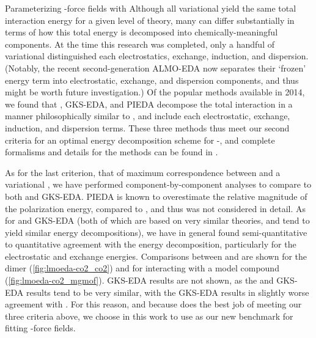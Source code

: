 \begin{section}{Parameterizing \cus-\mof force fields with \lmoeda}
Although all variational \edas yield the same
total interaction energy for a given level of theory, many \edas can differ substantially in terms of how
this total energy is decomposed into chemically-meaningful components. At the
time this research was completed, only a handful of variational \edas distinguished each
electrostatics, exchange, induction, and dispersion. (Notably, the recent
second-generation ALMO-EDA\cite{Horn2016b} now
separates their `frozen' energy term into electrostatic, exchange, and
dispersion components, and thus might be worth future investigation.) Of the
popular \eda methods available in 2014, we found that
\lmoeda,\cite{Su2009,Chen2010}
GKS-EDA,\cite{Su2014} and PIEDA\cite{Fedorov2006} decompose the total
interaction in a manner philosophically similar to \sapt, and include each
electrostatic, exchange, induction, and dispersion terms. These three methods
thus meet our second criteria for
an optimal energy decomposition scheme for \cus-\mofs, and complete formalisms and
details for the methods can be found in .

As for the last criterion, that of maximum correspondence between \sapt and a
variational \eda, we have performed component-by-component analyses
to compare \sapt to both \lmoeda and GKS-EDA. PIEDA is known to
overestimate the relative magnitude of the polarization energy, compared to
\sapt, and thus was not considered in detail.\cite{Pastorczak2017} As for
\lmoeda and GKS-EDA (both of which are based on very similar theories, and
tend to yield similar energy decompositions), we have in
general found semi-quantitative to quantitative agreement with the \sapt
energy decomposition, particularly for the electrostatic and exchange
energies. Comparisons between \lmoeda and \sapt are shown for the \co dimer
(\cref{fig:lmoeda-co2_co2}) and for \co interacting with a model \mgmof
compound (\cref{fig:lmoeda-co2_mgmof}). GKS-EDA results are not shown, as
the \lmoeda and GKS-EDA results tend to be very similar, with the GKS-EDA
results in slightly worse agreement with \sapt. For this reason, and because
\lmoeda does the best job of meeting our three criteria above, we choose in
this work to use \lmoeda as our new benchmark \eda for fitting \cus-\mof force
fields.



\end{section}
